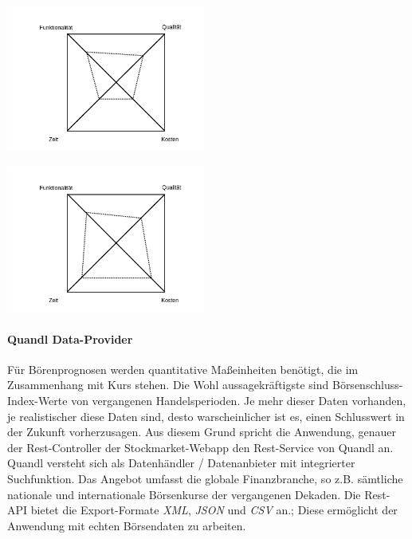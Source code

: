 \begin{minipage}[c]{0.5\textwidth}

\includegraphics[width=0.49\textwidth]{Bilder/Konzeption/mag_viereck_not_linear.png}

\end{minipage}
\begin{minipage}[c]{0.5\textwidth}
\includegraphics[width=0.49\textwidth]{Bilder/Konzeption/mag_viereck_linear.png}
\end{minipage}

\paragraph{Quandl Data-Provider}
Für Börenprognosen werden quantitative Maßeinheiten benötigt, die im Zusammenhang mit Kurs stehen. Die Wohl aussagekräftigste sind Börsenschluss-Index-Werte von vergangenen Handelsperioden. Je mehr dieser Daten vorhanden, je realistischer diese Daten sind, desto warscheinlicher ist es, einen Schlusswert in der Zukunft vorherzusagen. 
Aus diesem Grund spricht die Anwendung, genauer der Rest-Controller der Stockmarket-Webapp den Rest-Service von Quandl an.  
Quandl versteht sich als Datenhändler / Datenanbieter mit integrierter Suchfunktion. Das Angebot umfasst die globale Finanzbranche, so z.B. sämtliche nationale und internationale Börsenkurse der vergangenen Dekaden. 
Die Rest-API bietet die Export-Formate \emph{XML}, \emph{JSON} und \emph{CSV} an.\linebreak; 
Diese ermöglicht der Anwendung mit echten Börsendaten zu arbeiten. 

